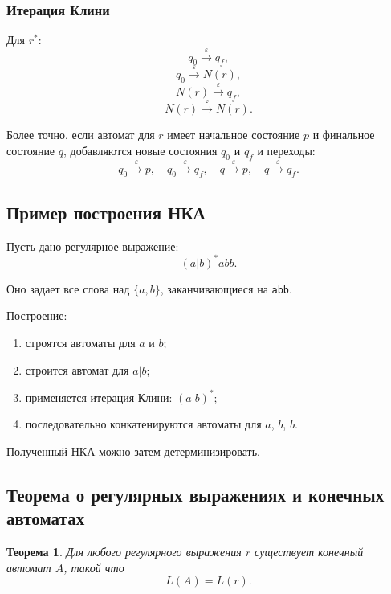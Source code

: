 \documentclass[12pt,a4paper]{article}
\newtheorem{theorem}{Теорема}
\begin{document}
\subsubsection*{Итерация Клини}

Для $r^*$:
\[
q_0 \xrightarrow{\varepsilon} q_f,
\]
\[
q_0 \xrightarrow{\varepsilon} N(r),
\]
\[
N(r) \xrightarrow{\varepsilon} q_f,
\]
\[
N(r) \xrightarrow{\varepsilon} N(r).
\]

Более точно, если автомат для $r$ имеет начальное состояние $p$ и финальное состояние $q$, добавляются новые состояния $q_0$ и $q_f$ и переходы:
\[
q_0 \xrightarrow{\varepsilon} p,\quad
q_0 \xrightarrow{\varepsilon} q_f,\quad
q \xrightarrow{\varepsilon} p,\quad
q \xrightarrow{\varepsilon} q_f.
\]

\subsection{Пример построения НКА}

Пусть дано регулярное выражение:
\[
(a|b)^*abb.
\]

Оно задает все слова над $\{a,b\}$, заканчивающиеся на \texttt{abb}.

Построение:
\begin{enumerate}
    \item строятся автоматы для $a$ и $b$;
    \item строится автомат для $a|b$;
    \item применяется итерация Клини: $(a|b)^*$;
    \item последовательно конкатенируются автоматы для $a$, $b$, $b$.
\end{enumerate}

Полученный НКА можно затем детерминизировать.

\subsection{Теорема о регулярных выражениях и конечных автоматах}

\begin{theorem}
Для любого регулярного выражения $r$ существует конечный автомат $A$, такой что
\[
L(A) = L(r).
\]
\end{theorem}
\end{document}
